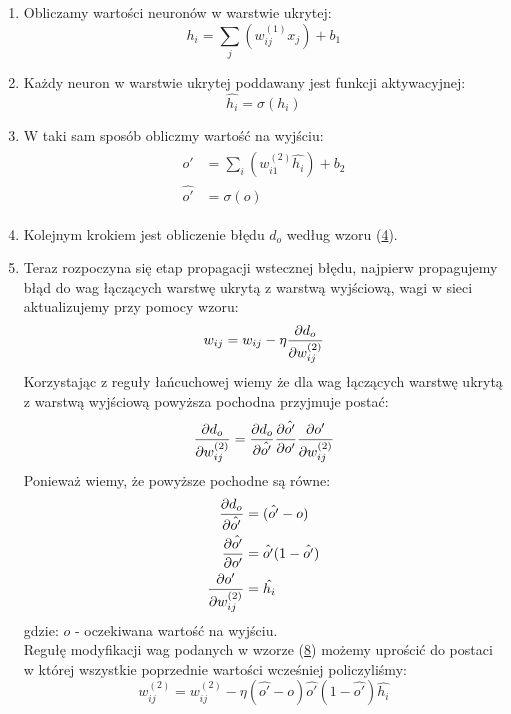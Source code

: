 \documentclass{article}
\begin{document}
\begin{enumerate}
\item Obliczamy wartości neuronów  w warstwie ukrytej:
\begin{equation}
	h_i = \sum_{j} (w_{ij}^{(1)}x_j) + b_1
\end{equation}
\item Każdy neuron w warstwie ukrytej poddawany jest funkcji aktywacyjnej:
\begin{equation}
	\hat{h_i} = \sigma(h_i)
\end{equation}
\item W taki sam sposób obliczmy wartość na wyjściu:
\begin{align}
\begin{split}
	o' &= \sum_{i} (w_{i1}^{(2)}\hat{h_i}) + b_2\\
	\hat{o'} &= \sigma(o)
\end{split}
\end{align}
\item Kolejnym krokiem jest obliczenie błędu $d_o$ według wzoru (\hyperref[wz:4]{4}). 
\item Teraz rozpoczyna się etap propagacji wstecznej błędu, najpierw propagujemy błąd
do wag łączących warstwę ukrytą z warstwą wyjściową, wagi w sieci aktualizujemy przy pomocy wzoru:
\begin{equation}
\label{wz:8}
	w_{ij} = w_{ij} - \eta \pdv{d_o}{w_{ij}^{(2)}}
\end{equation}
Korzystając z reguły łańcuchowej wiemy że dla wag łączących warstwę ukrytą z warstwą wyjściową
powyższa pochodna przyjmuje postać:
\begin{equation}
	\pdv{d_o}{w_{ij}^{(2)}} = \pdv{d_o}{\hat{o'}} \pdv{\hat{o'}}{o'} \pdv{o'}{w_{ij}^{(2)}}
\end{equation}
Ponieważ wiemy, że powyższe pochodne są równe:
\begin{align}
\begin{split} 
	\pdv{d_o}{\hat{o'}} &= (\hat{o'} - o) \\
	\pdv{\hat{o'}}{o'} &=\hat{o'}(1 - \hat{o'}) \\
	\pdv{o'}{w_{ij}^{(2)}} &= \hat{h_i}
\end{split}
\end{align}
gdzie: $o$ - oczekiwana wartość na wyjściu.\\
Regułę modyfikacji wag podanych w wzorze (\hyperref[wz:8]{8}) możemy uprościć do postaci w której
wszystkie poprzednie wartości wcześniej policzyliśmy:
\begin{equation}
	w_{ij}^{(2)} = w_{ij}^{(2)} - \eta(\hat{o'} - o)\hat{o'}(1 - \hat{o'})\hat{h_i}

\end{equation}
\end{enumerate}
\end{document}
